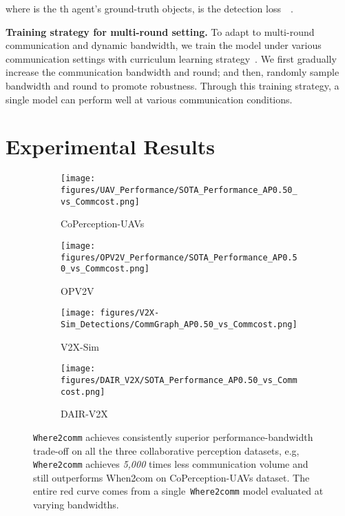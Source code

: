 \documentclass{article}
\begin{document}
where  is the th agent's ground-truth objects,  is the detection loss~~\cite{zhou2019objects}.


\textbf{Training strategy for multi-round setting.} To adapt to multi-round communication and dynamic bandwidth, we train the model under various communication settings with curriculum learning strategy~\cite{curriculum}. We first gradually increase the communication bandwidth and round; and then, randomly sample bandwidth and round to promote robustness. Through this training strategy, a single model can perform well at various communication conditions.
%
 \vspace{-2mm}
\section{Experimental Results}
\vspace{-2mm}


\begin{figure}[!t]
  \centering
\begin{subfigure}{0.49\linewidth}
    \texttt{[image: figures/UAV\_Performance/SOTA\_Performance\_AP0.50\_vs\_Commcost.png]}
    \caption{CoPerception-UAVs}
    \label{fig:UAV_SOTA}
  \end{subfigure}
\begin{subfigure}{0.49\linewidth}
    \texttt{[image: figures/OPV2V\_Performance/SOTA\_Performance\_AP0.50\_vs\_Commcost.png]}
    \caption{OPV2V}
    \label{fig:OPV2V_SOTA}
  \end{subfigure}
\begin{subfigure}{0.49\linewidth}
    \texttt{[image: figures/V2X-Sim\_Detections/CommGraph\_AP0.50\_vs\_Commcost.png]}
    \caption{V2X-Sim}
    \label{fig:V2X_SOTA}
    \end{subfigure}
\begin{subfigure}{0.49\linewidth}
    \texttt{[image: figures/DAIR\_V2X/SOTA\_Performance\_AP0.50\_vs\_Commcost.png]}
    \caption{DAIR-V2X}
    \label{fig:DAIR_SOTA}
    \end{subfigure}
  \vspace{-1mm}
  \caption{\texttt{Where2comm} achieves consistently superior performance-bandwidth trade-off on all the three collaborative perception datasets, e.g, \texttt{Where2comm} achieves \emph{5,000} times less communication volume and still outperforms When2com on CoPerception-UAVs dataset. The entire red curve comes from a single~\texttt{Where2comm} model evaluated at varying bandwidths.}
  \label{fig:SOTA}
  \vspace{-3mm}
\end{figure}
\end{document}
